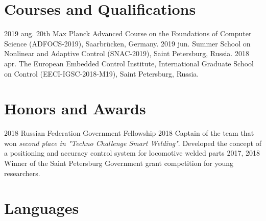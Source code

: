 \documentclass{ncv}
\begin{document}
\section{Courses and Qualifications}
\begin{two_col_entry_list}
    \entryc
		{2019 aug.}
		{20th Max Planck Advanced Course on the Foundations of Computer Science (ADFOCS-2019), Saarbrücken, Germany.}
    \entryc
		{2019 jun.}
		{Summer School on Nonlinear and Adaptive Control (SNAC-2019), Saint Petersburg, Russia.  }
    \entryc
		{2018 apr.}
		{The European Embedded Control Institute, International Graduate School on Control (EECI-IGSC-2018-M19), Saint Petersburg, Russia. }
\end{two_col_entry_list}

\section{Honors and Awards}
\begin{two_col_entry_list}
    \entryc
		{2018}
		{Russian Federation Government Fellowship}
	\entryc
		{2018}
		{Captain of the team that won \textit{second place in "Techno Challenge Smart Welding"}. Developed the concept of a positioning and accuracy control system for locomotive welded parts}
    \entryc
		{2017, 2018}
		{Winner of the Saint Petersburg Government grant competition for
young researchers.}

\end{two_col_entry_list}


\section{Languages}
\end{document}
